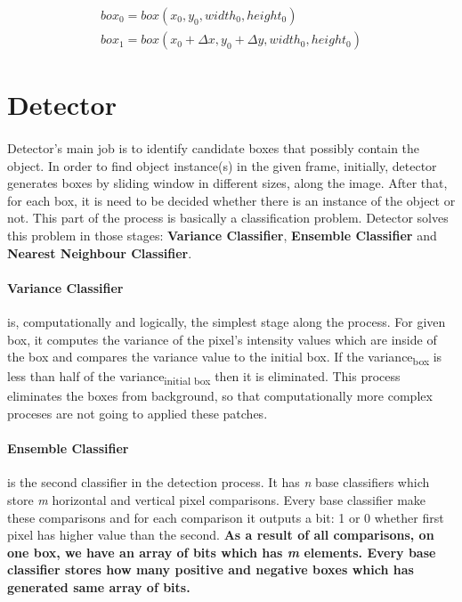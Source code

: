 \documentclass{report}
\begin{document}
            \begin{gather}
                box_{0} = box(x_{0}, y_{0}, width_{0}, height_{0}) \\
                box_{1} = box(x_{0} + \Delta x, y_{0} + \Delta y, width_{0}, height_{0})
            \end{gather}
    \section{Detector}
        \paragraph{}
            Detector's main job is to identify candidate boxes that possibly contain the object. In order to find
            object instance(s) in the given frame, initially, detector generates boxes by sliding window in different sizes,
            along the image. After that, for each box, it is need to be decided whether there is an instance of the object or not.
            This part of the process is basically a classification problem. Detector solves this problem in those stages:
            \textbf{Variance Classifier}, \textbf{Ensemble Classifier} and \textbf{Nearest Neighbour Classifier}.

        \paragraph{Variance Classifier}
            is, computationally and logically, the simplest stage along the process.
            For given box, it computes the variance of the pixel's intensity values which are inside of the box and
            compares the variance value to the initial box. If the variance\textsubscript{box} is less than half of the
            variance\textsubscript{initial box} then it is eliminated. This process eliminates the boxes from background, so that
            computationally more complex proceses are not going to applied these patches.

        \paragraph{Ensemble Classifier} is the second classifier in the detection process. It has
            \emph{n} base classifiers which store \emph{m} horizontal and vertical pixel comparisons.
            Every base classifier make these comparisons and for each comparison it outputs a bit: 1 or 0
            whether first pixel has higher value than the second.
            \textbf{As a result of all comparisons, on one box, we have an array of bits which has \emph{m} elements.
            Every base classifier stores how many positive and negative boxes which has generated same array of bits.}
\end{document}
